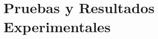 \chapter[Capítulo 4. Pruebas y Resultados Experimentales]{ Pruebas y Resultados Experimentales}
\pagestyle{fancy}

